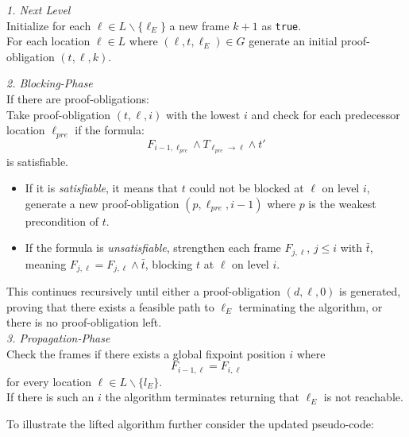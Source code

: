 \documentclass[11pt, a4paper, BCOR=10mm, ngerman, oneside]{scrbook}
\begin{document}
\textsl{1. Next Level} \\
Initialize for each $\ell \in L \backslash \{\ell_E\}$ a new frame $k + 1$ as \texttt{true}. \\
For each location $\ell \in L$ where $(\ell, t, \ell_E) \in G$ generate an initial proof-obligation $(t, \ell, k)$. \\

\pagebreak

\textsl{2. Blocking-Phase} \\
If there are proof-obligations: \\
Take proof-obligation $(t, \ell, i)$ with the lowest $i$ and check for each predecessor location $\ell_{pre}$ if the formula:
\begin{equation*}
F_{i - 1, \ell_{pre}} \land T_{\ell_{pre} \rightarrow \ell} \land t'
\end{equation*}
is satisfiable.
\begin{itemize}
\item If it is \textsl{satisfiable}, it means that $t$ could not be blocked at $\ell$ on level $i$, generate a new proof-obligation $(p, \ell_{pre}, i-1)$ where $p$ is the weakest precondition of $t$.

\item If the formula is \textsl{unsatisfiable}, strengthen each frame $F_{j, \ell}$, $j \leq i$ with $\bar t$, meaning $F_{j, \ell} = F_{j, \ell} \land \bar t$, blocking $t$ at $\ell$ on level $i$.
\end{itemize}

This continues recursively until either a proof-obligation $(d, \ell, 0)$ is generated, proving that there exists a feasible path to $\ell_E$ terminating the algorithm, or there is no proof-obligation left. \\

\textsl{3. Propagation-Phase} \\
Check the frames if there exists a global fixpoint position $i$ where
\begin{equation*}
F_{i-1, \ell} = F_{i, \ell}
\end{equation*}
for every location $\ell \in L \backslash \{l_E \}$. \\
If there is such an $i$ the algorithm terminates returning that $\ell_E$ is not reachable. \\

\pagebreak

To illustrate the lifted algorithm further consider the updated pseudo-code: \\ \\
\end{document}
